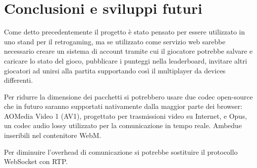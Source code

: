 %
%

\chapter{Conclusioni e sviluppi futuri}

Come detto precedentemente il progetto è stato pensato per essere utilizzato in uno stand per il retrogaming, ma se utilizzato come servizio web sarebbe necessario creare un sistema di account tramite cui il giocatore potrebbe salvare e caricare lo stato del gioco, pubblicare i punteggi nella leaderboard, invitare altri giocatori ad unirsi alla partita supportando così il multiplayer da devices differenti.

Per ridurre la dimensione dei pacchetti si potrebbero usare due codec open-source che in futuro saranno supportati nativamente dalla maggior parte dei browser: AOMedia Video 1 (AV1), progettato per trasmissioni video su Internet, e Opus, un codec audio lossy utilizzato per la comunicazione in tempo reale. Ambedue inseribili nel contenitore WebM.

Per diminuire l'overhead di comunicazione si potrebbe sostituire il protocollo WebSocket con RTP.